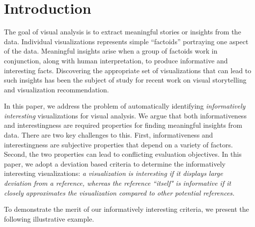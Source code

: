 \section{Introduction}
\par The goal of visual analysis is to extract meaningful stories or insights from the data. Individual visualizations represents simple ``factoids'' portraying one aspect of the data. Meaningful insights arise when a group of factoids work in conjunction, along with human interpretation, to produce informative and interesting facts. Discovering the appropriate set of visualizations that can lead to such insights has been the subject of study for recent work on visual storytelling\cite{Kim2017,Hullman2017,Segel2010,Hullman2013} and visualization recommendation\cite{Vartak2015}. 


In this paper, we address the problem of automatically identifying \emph{informatively interesting} visualizations for visual analysis. We argue that both informativeness and interestingness are required properties for finding meaningful insights from data. There are two key challenges to this. First, informativeness and interestingness are subjective properties that depend on a variety of factors. Second, the two properties can lead to conflicting evaluation objectives. In this paper, we adopt a deviation based criteria to determine the informatively interesting visualizations: \emph{a visualization is interesting if it displays large deviation from a reference, whereas the reference ``itself" is informative if it closely approximates the visualization compared to other potential references.} 

To demonstrate the merit of our informatively interesting criteria, we present the following illustrative example. 

